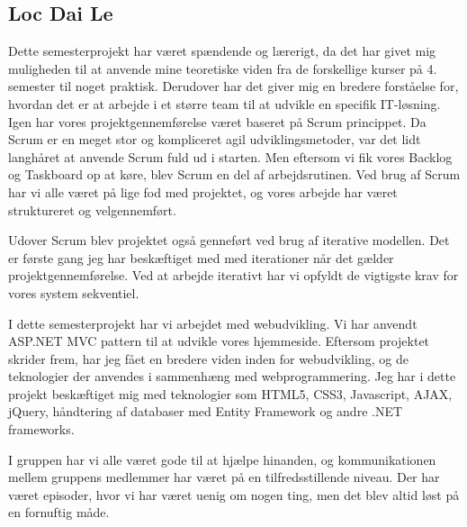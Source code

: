 \subsection*{Loc Dai Le}

Dette semesterprojekt har været spændende og lærerigt, da det har givet mig muligheden til at anvende mine teoretiske viden fra de forskellige kurser på 4. semester til noget praktisk. Derudover har det giver mig en bredere forståelse for, hvordan det er at arbejde i et større team til at udvikle en specifik IT-løsning. 
Igen har vores projektgennemførelse været baseret på Scrum princippet. Da Scrum er en meget stor og kompliceret agil udviklingsmetoder, var det lidt langhåret at anvende Scrum fuld ud i starten. Men eftersom vi fik vores Backlog og Taskboard op at køre, blev Scrum en del af arbejdsrutinen.   
Ved brug af Scrum har vi alle været på lige fod med projektet, og vores arbejde har været struktureret og velgennemført.

Udover Scrum blev projektet også genneført ved brug af iterative modellen. Det er første gang jeg har beskæftiget med med iterationer når det gælder projektgennemførelse. Ved at arbejde iterativt har vi opfyldt de vigtigste krav for vores system sekventiel. 

I dette semesterprojekt har vi arbejdet med webudvikling. Vi har anvendt ASP.NET MVC pattern til at udvikle vores hjemmeside. Eftersom projektet skrider frem, har jeg fået en bredere viden inden for webudvikling, og de teknologier der anvendes i sammenhæng med webprogrammering. Jeg har i dette projekt beskæftiget mig med teknologier som HTML5, CSS3, Javascript, AJAX, jQuery, håndtering af databaser med Entity Framework og andre .NET frameworks. 


I gruppen har vi alle været gode til at hjælpe hinanden, og kommunikationen mellem gruppens medlemmer har været på en tilfredsstillende niveau. Der har været episoder, hvor vi har været uenig om nogen ting, men det blev altid løst på en fornuftig måde. 